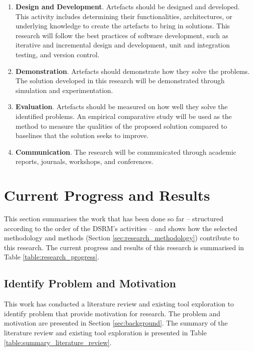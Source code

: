 \documentclass[12pt, a4paper]{report} \usepackage[titletoc]{appendix}
\begin{document}
\begin{enumerate}
    \item \textbf{Design and Development}. Artefacts should be designed and developed. This activity includes determining their functionalities, architectures, or underlying knowledge to create the artefacts to bring in solutions. This research will follow the best practices of software development, such as iterative and incremental design and development, unit and integration testing, and version control.
    \item \textbf{Demonstration}. Artefacts should demonstrate how they solve the problems. The solution developed in this research will be demonstrated through simulation and experimentation. 
    \item \textbf{Evaluation}. Artefacts should be measured on how well they solve the identified problems. An empirical comparative study will be used as the method to measure the qualities of the proposed solution compared to baselines that the solution seeks to improve.
    \item \textbf{Communication}. The research will be communicated through academic reports, journals, workshops, and conferences.
\end{enumerate}

\section{Current Progress and Results}
\label{sec:current_progress_and_results}
This section summarises the work that has been done so far -- structured according to the order of the DSRM's activities -- and shows how the selected methodology and methods (Section \ref{sec:research_methodology}) contribute to this research. The current progress and results of this research is summarised in Table \ref{table:research_progress}.

\subsection{Identify Problem and Motivation}
\label{subsec:identify_problem_and_motivation}
This work has conducted a literature review and existing tool exploration to identify problem that provide motivation for research. The problem and motivation are presented in Section \ref{sec:background}. The summary of the literature review and existing tool exploration is presented in Table \ref{table:summary_literature_review}.
\end{document}
